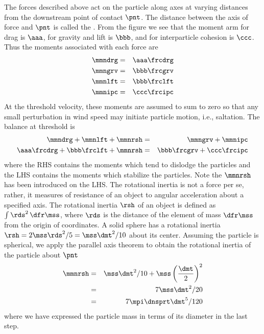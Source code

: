 \documentclass[12pt,twoside]{book}
\begin{document}
The forces described above act on the particle along axes at varying
distances from the downstream point of contact $\pnt$.  
The distance between the axis of force and $\pnt$ is called the
. 
From the figure we see that the moment arm for drag is $\aaa$, 
for gravity and lift is $\bbb$, and for interparticle cohesion is
$\ccc$. 
Thus the moments associated with each force are  
\begin{eqnarray}
\mmndrg & = & \aaa \frcdrg \nonumber \\
\mmngrv & = & \bbb \frcgrv \nonumber \\
\mmnlft & = & \bbb \frclft \nonumber \\
\mmnipc & = & \ccc \frcipc
\label{eqn:mmn_dfn}
\end{eqnarray}
At the threshold velocity, these moments are assumed to sum to zero 
so that any small perturbation in wind speed may initiate particle
motion, i.e., saltation.
The balance at threshold is 
\begin{eqnarray}
\mmndrg + \mmnlft + \mmnrsh & = & \mmngrv + \mmnipc \nonumber \\
\aaa \frcdrg + \bbb \frclft + \mmnrsh & = & \bbb \frcgrv + \ccc \frcipc
\label{eqn:mmn_eqm}
\end{eqnarray}
where the RHS contains the moments which tend to dislodge the
particles and the LHS contains the moments which stabilize the
particles. 
Note the  $\mmnrsh$ has been 
introduced on the LHS. 
The rotational inertia is not a force per se, rather, it measures
of resistance of an object to angular acceleration about a specified
axis. 
The rotational inertia $\rsh$ of an object is defined as 
$\int \rds^{2} \,\dfr\mss$, where $\rds$ is the distance of the element of
mass $\dfr\mss$ from the origin of coordinates.
A solid sphere has a rotational inertia 
$\rsh = 2 \mss \rds^{2} / 5 = \mss \dmt^{2} / 10$
about its center. 
Assuming the particle is spherical, we apply the parallel axis theorem
to obtain the rotational inertia of the particle about $\pnt$   
\begin{eqnarray}
\mmnrsh & = & { \mss \dmt^{2} / 10} + \mss \left( \frac{\dmt}{2}
\right)^{2} \nonumber \\ 
& = & { 7 \mss \dmt^{2} / 20} \nonumber \\ 
& = & { 7 \mpi \dnsprt \dmt^{5} / 120}
\label{eqn:mmn_rsh_dfn}
\end{eqnarray}
where we have expressed the particle mass in terms of its diameter in
the last step.
\end{document}

